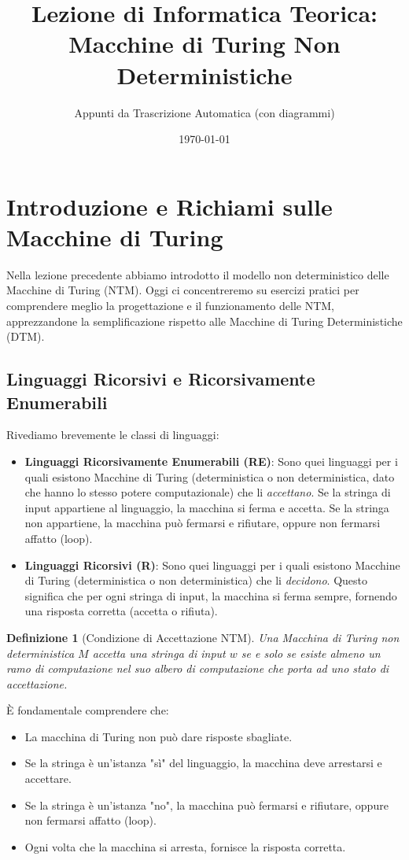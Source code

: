 \documentclass[a4paper]{article}
\title{Lezione di Informatica Teorica: Macchine di Turing Non Deterministiche}
\author{Appunti da Trascrizione Automatica (con diagrammi)}
\date{\today}
\newtheorem{definition}{Definizione}[section]
\begin{document}
\maketitle
\tableofcontents
\newpage

\section{Introduzione e Richiami sulle Macchine di Turing}

Nella lezione precedente abbiamo introdotto il modello non deterministico delle Macchine di Turing (NTM). Oggi ci concentreremo su esercizi pratici per comprendere meglio la progettazione e il funzionamento delle NTM, apprezzandone la semplificazione rispetto alle Macchine di Turing Deterministiche (DTM).

\subsection{Linguaggi Ricorsivi e Ricorsivamente Enumerabili}

Rivediamo brevemente le classi di linguaggi:
\begin{itemize}
    \item \textbf{Linguaggi Ricorsivamente Enumerabili (RE)}: Sono quei linguaggi per i quali esistono Macchine di Turing (deterministica o non deterministica, dato che hanno lo stesso potere computazionale) che li \emph{accettano}. Se la stringa di input appartiene al linguaggio, la macchina si ferma e accetta. Se la stringa non appartiene, la macchina può fermarsi e rifiutare, oppure non fermarsi affatto (loop).
    \item \textbf{Linguaggi Ricorsivi (R)}: Sono quei linguaggi per i quali esistono Macchine di Turing (deterministica o non deterministica) che li \emph{decidono}. Questo significa che per ogni stringa di input, la macchina si ferma sempre, fornendo una risposta corretta (accetta o rifiuta).
\end{itemize}

\begin{definition}[Condizione di Accettazione NTM]
Una Macchina di Turing non deterministica $M$ accetta una stringa di input $w$ se e solo se esiste almeno un ramo di computazione nel suo albero di computazione che porta ad uno stato di accettazione.
\end{definition}

È fondamentale comprendere che:
\begin{itemize}
    \item La macchina di Turing non può dare risposte sbagliate.
    \item Se la stringa è un'istanza "sì" del linguaggio, la macchina deve arrestarsi e accettare.
    \item Se la stringa è un'istanza "no", la macchina può fermarsi e rifiutare, oppure non fermarsi affatto (loop).
    \item Ogni volta che la macchina si arresta, fornisce la risposta corretta.
\end{itemize}
\end{document}
